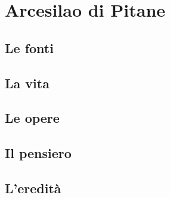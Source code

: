 \chapter{Arcesilao di Pitane}

\section{Le fonti}

\section{La vita}

\section{Le opere}

\section{Il pensiero}

\section{L'eredità}
